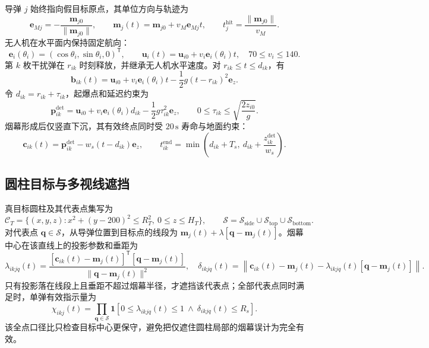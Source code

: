 \documentclass[UTF8,a4paper,zihao=-4]{ctexart}
\newcommand{\vect}[1]{\bm{#1}}
\begin{document}
导弹 \(j\) 始终指向假目标原点，其单位方向与轨迹为
\begin{equation}
\vect e_{Mj}=-\frac{\vect m_{j0}}{\lVert\vect m_{j0}\rVert},\qquad
\vect m_j(t)=\vect m_{j0}+v_M\vect e_{Mj}t,\qquad
t_j^{\mathrm{hit}}=\frac{\lVert\vect m_{j0}\rVert}{v_M}.
\label{eq:missile-trajectory}
\end{equation}
无人机在水平面内保持固定航向：
\begin{equation}
\vect e_i(\theta_i)=(\cos\theta_i,\sin\theta_i,0)^{\mathsf T},\qquad
\vect u_i(t)=\vect u_{i0}+v_i\vect e_i(\theta_i)t,
\quad 70\le v_i\le140.
\label{eq:uav-trajectory}
\end{equation}
第 \(k\) 枚干扰弹在 \(r_{ik}\) 时刻释放，并继承无人机水平速度。对
\(r_{ik}\le t\le d_{ik}\)，有
\begin{equation}
\vect b_{ik}(t)=\vect u_{i0}+v_i\vect e_i(\theta_i)t
-\frac12 g(t-r_{ik})^2\vect e_z .
\label{eq:bomb-trajectory}
\end{equation}
令 \(d_{ik}=r_{ik}+\tau_{ik}\)，起爆点和延迟约束为
\begin{equation}
\vect p_{ik}^{\mathrm{det}}
=\vect u_{i0}+v_i\vect e_i(\theta_i)d_{ik}
-\frac12g\tau_{ik}^{2}\vect e_z,\qquad
0\le\tau_{ik}\le\sqrt{\frac{2z_{i0}}{g}}.
\label{eq:detonation}
\end{equation}
烟幕形成后仅竖直下沉，其有效终点同时受 \(20\,\mathrm s\) 寿命与地面约束：
\begin{equation}
\vect c_{ik}(t)=\vect p_{ik}^{\mathrm{det}}-w_s(t-d_{ik})\vect e_z,\qquad
t_{ik}^{\mathrm{end}}=
\min\!\left(d_{ik}+T_s,\ d_{ik}+\frac{z_{ik}^{\mathrm{det}}}{w_s}\right).
\label{eq:smoke-trajectory}
\end{equation}

\subsection{圆柱目标与多视线遮挡}

真目标圆柱及其代表点集写为
\begin{equation}
\mathcal C_T=\{(x,y,z):x^2+(y-200)^2\le R_T^2,\ 0\le z\le H_T\},
\qquad
\mathcal S=\mathcal S_{\mathrm{side}}\cup\mathcal S_{\mathrm{top}}\cup\mathcal S_{\mathrm{bottom}}.
\label{eq:target-cylinder}
\end{equation}
对代表点 \(\vect q\in\mathcal S\)，从导弹位置到目标点的线段为
\(\vect m_j(t)+\lambda[\vect q-\vect m_j(t)]\)。烟幕中心在该直线上的投影参数和垂距为
\begin{equation}
\lambda_{ikjq}(t)=
\frac{[\vect c_{ik}(t)-\vect m_j(t)]^{\mathsf T}[\vect q-\vect m_j(t)]}
{\lVert\vect q-\vect m_j(t)\rVert^2},
\quad
\delta_{ikjq}(t)=
\left\|\vect c_{ik}(t)-\vect m_j(t)-\lambda_{ikjq}(t)[\vect q-\vect m_j(t)]\right\|.
\label{eq:los-clearance}
\end{equation}
只有投影落在线段上且垂距不超过烟幕半径，才遮挡该代表点；全部代表点同时满足时，单弹有效指示量为
\begin{equation}
\chi_{ikj}(t)=
\prod_{\vect q\in\mathcal S}
\mathbf 1\!\left[0\le\lambda_{ikjq}(t)\le1\ \land\ \delta_{ikjq}(t)\le R_s\right].
\label{eq:occlusion-indicator}
\end{equation}
该全点口径比只检查目标中心更保守，避免把仅遮住圆柱局部的烟幕误计为完全有效。
\end{document}
